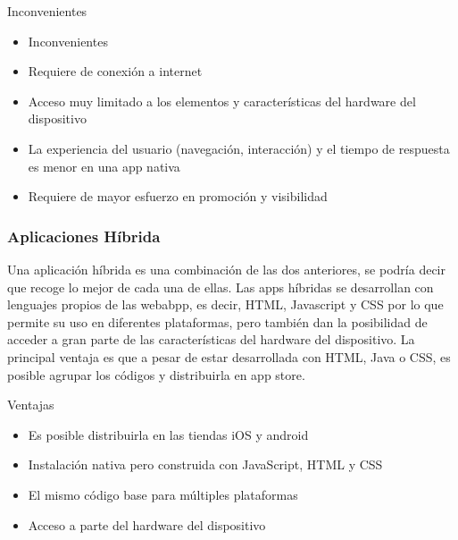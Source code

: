Inconvenientes

\begin{itemize}

	\item Inconvenientes
	
	\item Requiere de conexión a internet
	
	\item Acceso muy limitado a los elementos y características del hardware del dispositivo
	
	\item La experiencia del usuario (navegación, interacción) y el tiempo de respuesta es menor en una app nativa
	
	\item Requiere de mayor esfuerzo en promoción y visibilidad

\end{itemize}

\subsubsection{Aplicaciones Híbrida}

\setlength{\parskip}{5mm}
Una aplicación híbrida es una combinación de las dos anteriores, se podría decir que recoge lo mejor de cada una de ellas. Las apps híbridas se desarrollan con lenguajes propios de las webabpp, es decir, HTML, Javascript y CSS por lo que permite su uso en diferentes plataformas, pero también dan la posibilidad de acceder a gran parte de las características del hardware del dispositivo. La principal ventaja es que a pesar de estar desarrollada con HTML, Java o CSS, es posible agrupar los códigos y distribuirla en app store.


Ventajas
\setlength{\parskip}{0mm}
\begin{itemize}

	\item Es posible distribuirla en las tiendas iOS y android 
	
	\item Instalación nativa pero construida con JavaScript, HTML y CSS
	
	\item El mismo código base para múltiples plataformas
	
	\item Acceso a parte del hardware del dispositivo
	
\end{itemize}

